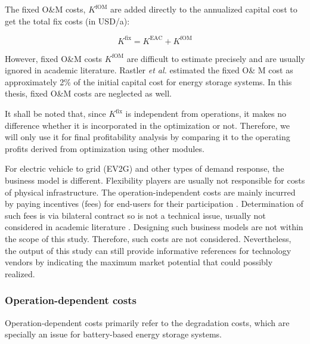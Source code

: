 The fixed O\&M costs, $K^{\text{fOM}}$ are added directly to the annualized capital cost to get the total fix costs (in USD/a):

\begin{equation}
K^{\text{fix}}  = K^{\text{EAC}}  +  K^{\text{fOM}} 
\end{equation}

However, fixed O\&M costs $K^{\text{fOM}}$ are difficult to estimate precisely and are usually ignored in academic literature. Rastler \textit{et al.} \cite{Rastler2010} estimated the fixed O\& M cost as approximately 2\% of the initial capital cost for energy storage systems. In this thesis, fixed O\&M costs are neglected as well.

It shall be noted that, since $K^{\text{fix}}$ is independent from operations, it makes no difference whether it is incorporated in the optimization or not. Therefore, we will only use it for final profitability analysis by comparing it to the operating profits derived from optimization using other modules. 

For electric vehicle to grid (EV2G) and other types of demand response, the business model is different. Flexibility players are usually not responsible for costs of physical infrastructure. The operation-independent costs are mainly incurred by paying incentives (fees) for end-users for their participation \cite{Mahmoudi2017}. Determination of such fees is via bilateral contract so is not a technical issue, usually not considered in academic literature \cite{Xu2017,HenriquezAuba2017}. Designing such business models are not within the scope of this study. Therefore, such costs are not considered. Nevertheless, the output of this study can still provide informative references for technology vendors by indicating the maximum market potential that could possibly realized.



\subsubsection{Operation-dependent costs}

Operation-dependent costs primarily refer to the degradation costs, which are specially an issue for battery-based energy storage systems\cite{Barre2013}.

